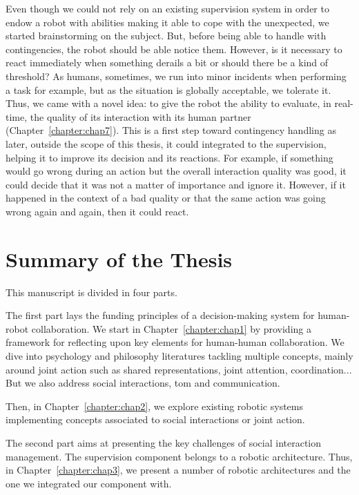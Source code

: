 \documentclass[a4paper,11pt,twoside]{StyleThese}
\begin{document}
Even though we could not rely on an existing supervision system in order to endow a robot with abilities making it able to cope with the unexpected, we started brainstorming on the subject. But, before being able to handle with contingencies, the robot should be able notice them. However, is it necessary to react immediately when something derails a bit or should there be a kind of threshold? As humans, sometimes, we run into minor incidents when performing a task for example, but as the situation is globally acceptable, we tolerate it. Thus, we came with a novel idea: to give the robot the ability to evaluate, in real-time, the quality of its interaction with its human partner (Chapter~\ref{chapter:chap7}). This is a first step toward contingency handling as later, outside the scope of this thesis, it could integrated to the supervision, helping it to improve its decision and its reactions. For example, if something would go wrong during an action but the overall interaction quality was good, it could decide that it was not a matter of importance and ignore it. However, if it happened in the context of a bad quality or that the same action was going wrong again and again, then it could react.

\section*{Summary of the Thesis}

This manuscript is divided in four parts. 

The first part lays the funding principles of a decision-making system for human-robot collaboration. We start in Chapter~\ref{chapter:chap1} by providing a framework for reflecting upon key elements for human-human collaboration. We dive into psychology and philosophy literatures tackling multiple concepts, mainly around joint action such as shared representations, joint attention, coordination... But we also address social interactions, \acrlong{tom} and communication. 

Then, in Chapter~\ref{chapter:chap2}, we explore existing robotic systems implementing concepts associated to social interactions or joint action.

\bigskip 

The second part aims at presenting the key challenges of social interaction management. The supervision component belongs to a robotic architecture. Thus, in Chapter~\ref{chapter:chap3}, we present a number of robotic architectures and the one we integrated our component with. 
\end{document}
